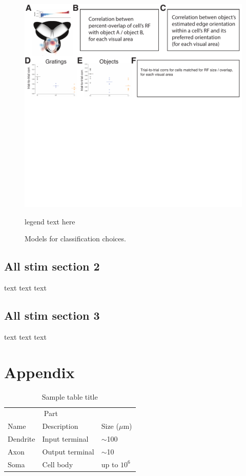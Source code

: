 \documentclass{article}
\begin{document}
\begin{figure}[ht]
  \includegraphics[width=\textwidth]{figures/allstim.pdf}
  \caption{Models for classification choices.}
  \medskip
  \small
  legend text here
  \label{fig:fig5}
\end{figure}

\subsection{All stim section 2}
text text text

\subsection{All stim section 3}
text text text



\section{Appendix}

\begin{table}
 \caption{Sample table title}
  \centering
  \begin{tabular}{lll}
    \toprule
    \multicolumn{2}{c}{Part}                   \\
    \cmidrule(r){1-2}
    Name     & Description     & Size ($\mu$m) \\
    \midrule
    Dendrite & Input terminal  & $\sim$100     \\
    Axon     & Output terminal & $\sim$10      \\
    Soma     & Cell body       & up to $10^6$  \\
    \bottomrule
  \end{tabular}
  \label{tab:table}
\end{table}
\end{document}
